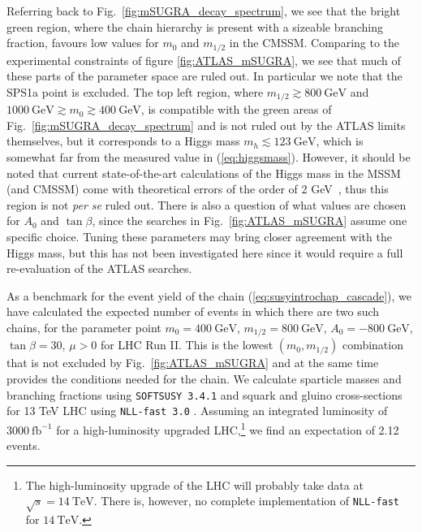 \documentclass[twoside,english]{uiofysmaster}
\begin{document}
Referring back to Fig.\ \ref{fig:mSUGRA_decay_spectrum}, we see that the bright green region, where the chain hierarchy is present with a sizeable branching fraction, favours low values for $m_0$ and $m_{1/2}$ in the CMSSM. Comparing to the experimental constraints of figure \ref{fig:ATLAS_mSUGRA}, we see that much of these parts of the parameter space are ruled out. In particular we note that the SPS1a point is excluded. The top left region, where $m_{1/2} \gtrsim 800~\mathrm{GeV}$ and $1000 ~\mathrm{GeV} \gtrsim m_0 \gtrsim 400 ~\mathrm{GeV}$, is compatible with the green areas of Fig.\ \ref{fig:mSUGRA_decay_spectrum} and is not ruled out by the ATLAS limits themselves, but it corresponds to a Higgs mass $m_h \lesssim 123 ~\mathrm{GeV}$, which is somewhat far from the measured value in (\ref{eq:higgsmass}). However, it should be noted that current state-of-the-art calculations of the Higgs mass in the MSSM (and CMSSM) come with theoretical errors of the order of 2 GeV~\cite{Heinemeyer:2015dsa}, thus this region is not {\it per se} ruled out. There is also a question of what values are chosen for $A_0$ and $\tan\beta$, since the searches in Fig.\ \ref{fig:ATLAS_mSUGRA} assume one specific choice. Tuning these parameters may bring closer agreement with the Higgs mass, but this has not been investigated here since it would require a full re-evaluation of the ATLAS searches.

As a benchmark for the event yield of the chain (\ref{eq:susyintrochap_cascade}), we have calculated the expected number of events in which there are two such chains, for the parameter point $m_0 = 400 ~\mathrm{GeV}$, $m_{1/2} = 800 ~\mathrm{GeV}$, $A_0 = -800~\mathrm{GeV}$, $\tan\beta = 30$, $\mu>0$ for LHC Run II. This is the lowest $(m_0,m_{1/2})$ combination that is not excluded by Fig.\ \ref{fig:ATLAS_mSUGRA} and at the same time provides the conditions needed for the chain. We calculate sparticle masses and branching fractions using {\tt SOFTSUSY 3.4.1} \cite{Allanach:2001kg} and squark and gluino cross-sections for 13 TeV LHC using {\tt NLL-fast 3.0} \cite{Beenakker:1996ch,Kulesza:2008jb,Kulesza:2009kq,Beenakker:2009ha,Beenakker:2011fu,Beenakker:1997ut,Beenakker:2010nq}. Assuming an integrated luminosity of $3000~\mathrm{fb}^{-1}$ for a high-luminosity upgraded LHC,\footnote{The high-luminosity upgrade of the LHC will probably take data at $\sqrt{s}=14~\mathrm{TeV}$. There is, however, no complete implementation of {\tt NLL-fast} for $14 ~\mathrm{TeV}$.} we find an expectation of 2.12 events.
\end{document}
